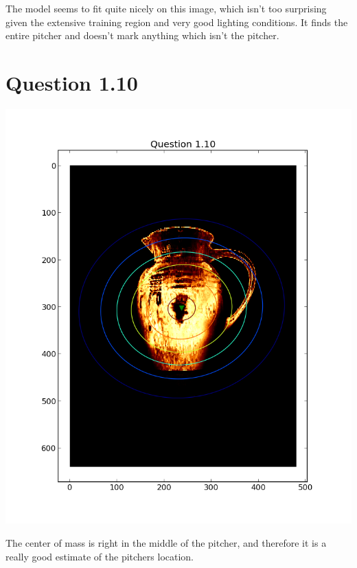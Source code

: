 \documentclass[11pt,a4paper]{article}
\begin{document}
The model seems to fit quite nicely on this image, which isn't too surprising given the
extensive training region and very good lighting conditions. It finds the entire pitcher
and doesn't mark anything which isn't the pitcher.


\section{Question 1.10}
\includegraphics[width=1.1\textwidth]{figure_8.png}

The center of mass is right in the middle of the pitcher, and therefore it is a really
good estimate of the pitchers location.
\end{document}
